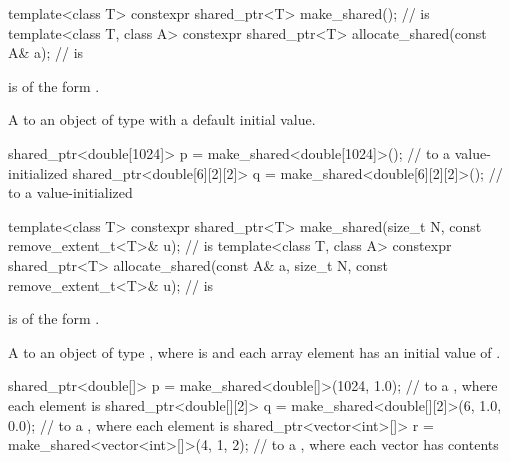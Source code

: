 %
%
\begin{itemdecl}
template<class T>
  constexpr shared_ptr<T> make_shared();                                  //  is 
template<class T, class A>
  constexpr shared_ptr<T> allocate_shared(const A& a);                    //  is 
\end{itemdecl}

\begin{itemdescr}
\pnum
\constraints
{} is of the form .

\pnum
\returns
A  to an object of type 
with a default initial value.

\pnum
\begin{example}
\begin{codeblock}
shared_ptr<double[1024]> p = make_shared<double[1024]>();
  //  to a value-initialized 
shared_ptr<double[6][2][2]> q = make_shared<double[6][2][2]>();
  //  to a value-initialized 
\end{codeblock}
\end{example}
\end{itemdescr}

%
%
\begin{itemdecl}
template<class T>
  constexpr shared_ptr<T> make_shared(size_t N,
                                      const remove_extent_t<T>& u);     //  is 
template<class T, class A>
  constexpr shared_ptr<T> allocate_shared(const A& a, size_t N,
                                          const remove_extent_t<T>& u); //  is 
\end{itemdecl}

\begin{itemdescr}
\pnum
\constraints
{} is of the form .

\pnum
\returns
A  to an object of type ,
where  is  and
each array element has an initial value of .

\pnum
\begin{example}
\begin{codeblock}
shared_ptr<double[]> p = make_shared<double[]>(1024, 1.0);
  //  to a , where each element is 
shared_ptr<double[][2]> q = make_shared<double[][2]>(6, {1.0, 0.0});
  //  to a , where each  element is 
shared_ptr<vector<int>[]> r = make_shared<vector<int>[]>(4, {1, 2});
  //  to a , where each vector has contents 
\end{codeblock}
\end{example}
\end{itemdescr}

